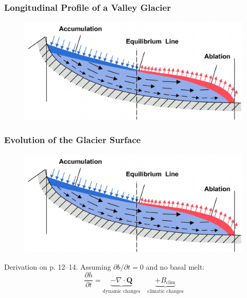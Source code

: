 \documentclass[hide notes,intlimits,unknownkeysallowed]{beamer}
\begin{document}
\begin{frame}
  \frametitle{Longitudinal Profile of a Valley Glacier}
  \begin{figure}
    \includegraphics[width=\textwidth]{flow_acc_abl}
  \end{figure}
\end{frame}

\begin{frame}
  \frametitle{Evolution of the Glacier Surface}
  \begin{figure}
    \includegraphics[width=.75\textwidth]{flow_acc_abl}
  \end{figure}
  Derivation on p. 12--14. Assuming $\partial b / \partial t = 0$ and no basal melt:
  \begin{equation*}
    \frac{\partial h}{\partial t} = \underbrace{-\nabla \cdot \mathbf{Q}}_{\text{dynamic changes}} \quad \underbrace{+B_{\text{clim}}}_{\text{climatic changes}}
  \end{equation*}
\end{frame}


{
%
} 
\end{document}
